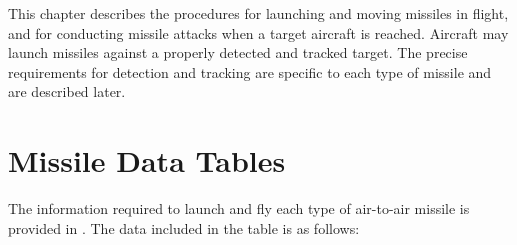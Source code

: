 
\label{rule:air-to-air-missiles}

This chapter describes the procedures for launching and moving missiles in flight, and for conducting missile attacks when a target aircraft is reached. Aircraft may launch missiles against a properly detected and tracked target. The precise requirements for detection and tracking are specific to each type of missile and are described later.

\section{Missile Data Tables}
\label{rule:missile-data}

The information required to launch and fly each type of air-to-air missile is provided in . The data included in the table is as follows:

